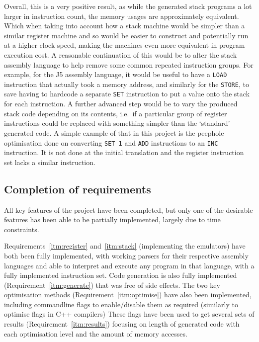 Overall, this is a very positive result, as while the generated stack programs a
lot larger in instruction count, the memory usages are approximately equivalent.
Which when taking into account how a stack machine would be simpler than a
similar register machine and so would be easier to construct and potentially run
at a higher clock speed, making the machines even more equivalent in program
execution cost. A reasonable continuation of this would be to alter the stack
assembly language to help remove some common repeated instruction groups. For
example, for the J5 assembly language, it would be useful to have a
\texttt{LOAD} instruction that actually took a memory address, and similarly for
the \texttt{STORE}, to save having to hardcode a separate \texttt{SET}
instruction to put a value onto the stack for each instruction. A further
advanced step would be to vary the produced stack code depending on its
contents, i.e.\ if a particular group of register instructions could be replaced
with something simpler than the `standard' generated code. A simple example of
that in this project is the peephole optimisation done on converting \texttt{SET
1} and \texttt{ADD} instructions to an \texttt{INC} instruction. It is not done
at the initial translation and the register instruction set lacks a similar
instruction.

\subsection{Completion of requirements}

All key features of the project have been completed, but only one of the
desirable features has been able to be partially implemented, largely due to
time constraints.

Requirements~\ref{itm:register} and~\ref{itm:stack} (implementing the emulators)
have both been fully implemented, with working parsers for their respective
assembly languages and able to interpret and execute any program in that
language, with a fully implemented instruction set. Code generation is also
fully implemented (Requirement~\ref{itm:generate}) that was free of side
effects. The two key optimisation methods (Requirement~\ref{itm:optimise}) have
also been implemented, including commandline flags to enable/disable them as
required (similarly to optimise flags in C++ compilers) These flags have been
used to get several sets of results (Requirement~\ref{itm:results}) focusing on
length of generated code with each optimisation level and the amount of memory
accesses.

